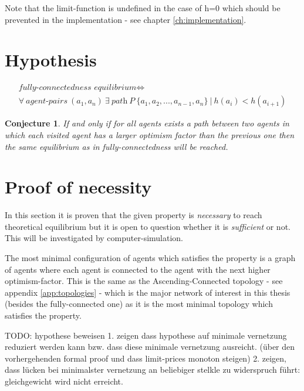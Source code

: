 \documentclass[Bachelorarbeit.tex]{subfiles}
\begin{document}
Note that the limit-function is undefined in the case of h=0 which should be prevented in the implementation - see chapter \ref{ch:implementation}.

\section{Hypothesis}
\begin{equation}
\begin{split}
\textit{fully-connectedness equilibrium} \iff \\
\forall \: \textit{agent-pairs} \: (a_{1},a_{n}) \: \exists \:  \textit{path} \: P \: \{a_{1}, a_{2}, ... , a_{n-1}, a_{n}\} \: | \: h(a_{i}) < h(a_{i+1})
\end{split}
\end{equation}

\newtheorem{conj}{Conjecture}
\begin{conj}
If and only if for all agents exists a path between two agents in which each visited agent has a larger optimism factor than the previous one then the same equilibrium as in fully-connectedness will be reached.
\end{conj}

\section{Proof of necessity}
In this section it is proven that the given property is \textit{necessary} to reach theoretical equilibrium but it is open to question whether it is \textit{sufficient} or not. This will be investigated by computer-simulation.

\medskip

The most minimal configuration of agents which satisfies the property is a graph of agents where each agent is connected to the agent with the next higher optimism-factor. This is the same as the Ascending-Connected topology - see appendix \ref{app:topologies} - which is the major network of interest in this thesis (besides the fully-connected one) as it is the most minimal topology which satisfies the property.

TODO: hypothese beweisen
1. zeigen dass hypothese auf minimale vernetzung reduziert werden kann bzw. dass diese minimale vernetzung ausreicht. (über den vorhergehenden formal proof und dass limit-prices monoton steigen)
2. zeigen, dass lücken bei minimalster vernetzung an beliebiger stelkle zu widerspruch führt: gleichgewicht wird nicht erreicht. 
\end{document}
